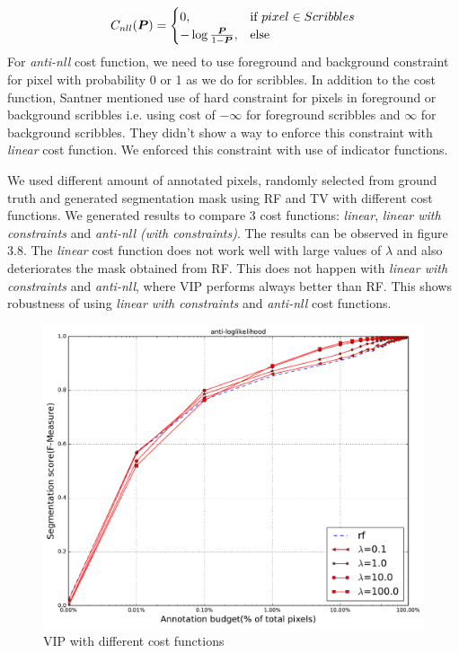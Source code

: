 \begin{align*}
\mathop{{}C_{nll}}(\boldsymbol{P}) =
\begin{cases}
  0, & \text{if}\ pixel \in Scribbles  \\
  -\log \frac{\boldsymbol{P}}{1-\boldsymbol{P}}, & \text{else}
\end{cases}
\end{align*} 
For \textit{anti-nll} cost function, we need to use foreground and background constraint for pixel with probability 0 or 1 as we do for scribbles. In addition to the cost function, Santner \cite{santner:2009} mentioned use of hard constraint for pixels in foreground or background scribbles i.e. using cost of $-\infty$ for foreground scribbles and $\infty$ for background scribbles. They didn't show a way to enforce this constraint with \textit{linear} cost function. We enforced this constraint with use of indicator functions. \par
We used different amount of annotated pixels, randomly selected from ground truth and generated segmentation mask using RF and TV with different cost functions. We generated results to compare 3 cost functions: \textit{linear}, \textit{linear with constraints} and \textit{anti-nll (with constraints)}. The results can be observed in figure 3.8. The 
\textit{linear} cost function does not work well with large values of $\lambda$ and also deteriorates the mask obtained from RF. This does not happen with \textit{linear with constraints} and \textit{anti-nll}, where VIP performs always better than RF. This shows robustness of using \textit{linear with constraints} and \textit{anti-nll} cost functions.
\begin{figure}[h!] \label{fig:rf_vip1}
 \includegraphics[width=0.8\linewidth]{figures/anti_nll.pdf}
\caption{VIP with different cost functions}
\end{figure}

